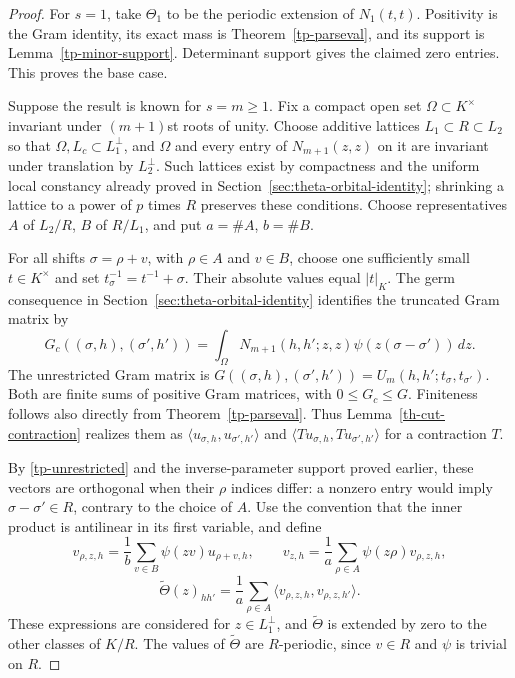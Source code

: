 \begin{proof}
For $s=1$, take $\Theta_1$ to be the periodic extension of
$N_1(t,t)$. Positivity is the Gram identity, its exact mass is
Theorem~\ref{tp-parseval}, and its support is
Lemma~\ref{tp-minor-support}. Determinant support gives the
claimed zero entries. This proves the base case.

Suppose the result is known for $s=m\ge1$. Fix a compact open
set $\Omega\subset K^\times$ invariant under $(m+1)$st roots
of unity. Choose additive lattices $L_1\subset R\subset L_2$
so that $\Omega,L_c\subset L_1^\perp$, and $\Omega$ and every
entry of $N_{m+1}(z,z)$ on it are invariant under translation
by $L_2^\perp$. Such lattices exist by compactness and the
uniform local constancy already proved in
Section~\ref{sec:theta-orbital-identity}; shrinking a lattice
to a power of $p$ times $R$ preserves these conditions.
Choose representatives $A$ of $L_2/R$, $B$ of $R/L_1$, and
put $a=\#A$, $b=\#B$.

For all shifts $\sigma=\rho+v$, with $\rho\in A$ and $v\in B$,
choose one sufficiently small $t\in K^\times$ and set
$t_\sigma^{-1}=t^{-1}+\sigma$. Their absolute values equal
$|t|_K$. The germ consequence in
Section~\ref{sec:theta-orbital-identity} identifies the truncated
Gram matrix by
\begin{equation}\label{tp-truncated-average}
 G_c((\sigma,h),(\sigma',h'))
       =\int_\Omega N_{m+1}(h,h';z,z)
                             \psi(z(\sigma-\sigma'))\,dz.
\end{equation}
The unrestricted Gram matrix is
$G((\sigma,h),(\sigma',h'))=U_m(h,h';t_\sigma,t_{\sigma'})$.
Both are finite sums of positive Gram matrices, with
$0\le G_c\le G$. Finiteness follows also directly from
Theorem~\ref{tp-parseval}. Thus Lemma~\ref{th-cut-contraction}
realizes them as $\langle u_{\sigma,h},u_{\sigma',h'}\rangle$
and $\langle Tu_{\sigma,h},Tu_{\sigma',h'}\rangle$ for a
contraction $T$.

By \eqref{tp-unrestricted} and the inverse-parameter support
proved earlier, these vectors are orthogonal when their
$\rho$ indices differ: a nonzero entry would imply
$\sigma-\sigma'\in R$, contrary to the choice of $A$.
Use the convention that the inner product is antilinear in
its first variable, and define
\[
 v_{\rho,z,h}=\frac1b\sum_{v\in B}\psi(zv)u_{\rho+v,h},\qquad
 v_{z,h}=\frac1a\sum_{\rho\in A}\psi(z\rho)v_{\rho,z,h},
\]
\[
 \widetilde\Theta(z)_{hh'}=
       \frac1a\sum_{\rho\in A}
             \langle v_{\rho,z,h},v_{\rho,z,h'}\rangle.
\]
These expressions are considered for $z\in L_1^\perp$, and
$\widetilde\Theta$ is extended by zero to the other classes
of $K/R$. The values of $\widetilde\Theta$ are $R$-periodic,
since $v\in R$ and $\psi$ is trivial on $R$.


\end{proof}
